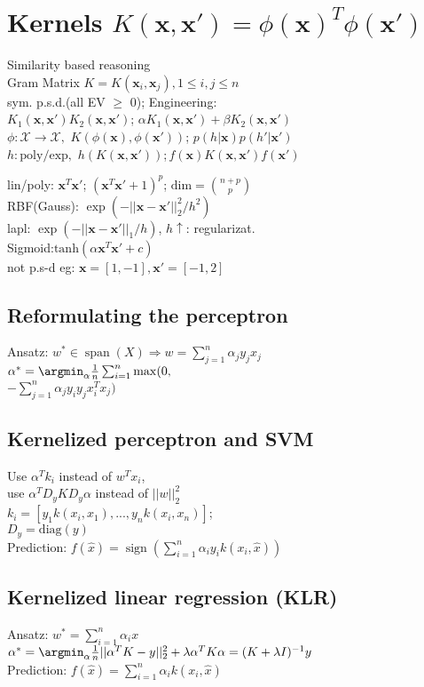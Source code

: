 \section*{Kernels $K(\mathbf{x}, \mathbf{x'}) {=} \phi(\mathbf{x})^T\phi(\mathbf{x'})$}
Similarity based reasoning\\
Gram Matrix $K{=}K(\mathbf{x}_i, \mathbf{x}_j), 1{\leq} i,j{\leq} n$\\
sym. p.s.d.(all EV $\geq$ 0); Engineering:\\
$K_1(\mathbf{x}, \mathbf{x'})K_2(\mathbf{x}, \mathbf{x'})$; 
$\alpha K_1(\mathbf{x}, \mathbf{x'})+\beta K_2(\mathbf{x}, \mathbf{x'})$\\
$\phi:\mathcal{X}{\rightarrow}\mathcal{X},\,\,K(\phi(\mathbf{x}), \phi(\mathbf{x'}))$; $p(h|\mathbf{x})p(h'|\mathbf{x'})$\\ 
$h: \mathrm{poly/exp},\,\, h(K(\mathbf{x}, \mathbf{x'}))$;$ \, f(\mathbf{x})K(\mathbf{x},\mathbf{x'})f(\mathbf{x'})$

lin/poly: $\mathbf{x}^T\mathbf{x'}$; $(\mathbf{x}^T\mathbf{x'}{+}1)^p$;
$\mathrm{dim}=\binom{n+p}{p}$\\
RBF(Gauss): $\exp(-||\mathbf{x}{-}\mathbf{x'}||_2^2/h^2)$\\
lapl: $\exp(-||\mathbf{x}{-}\mathbf{x'}||_1/h)$, $h\uparrow$: regularizat.\\
Sigmoid:$\mathrm{tanh}(\alpha\mathbf{x}^T\mathbf{x'}+c)$\\
not p.s-d eg: $\mathbf{x}{=}[1,-1], \mathbf{x'}{=}[-1,2]$

\subsection*{Reformulating the perceptron}
Ansatz: $w^* \in \operatorname{span}(X) \Rightarrow w = \sum_{j=1}^n \alpha_j y_j x_j$\\
$\alpha^*= \argmin_{\alpha} \frac{1}{n} \sum_{i=1}^n \max(0,$\\$- \sum_{j=1}^n \alpha_j y_i y_j x_i^T x_j)$

\subsection*{Kernelized perceptron and SVM}
Use $\alpha^T k_i$ instead of $w^T x_i$,\\
use $\alpha^T D_y K D_y \alpha$ instead of $||w||_2^2$\\ 
$k_i=[y_1 k(x_i,x_1), ..., y_n k(x_i,x_n)]$;\\
$D_y = \text{diag}(y)$\\
Prediction: $f(\hat{x}) = \operatorname{sign}(\sum_{i=1}^n \alpha_i y_i k(x_i, \hat{x}))$

\subsection*{Kernelized linear regression (KLR)}
Ansatz: $w^*=\sum_{i = 1}^n \alpha_i x$\\
$\alpha^*= \argmin_{\alpha}\frac{1}{n} ||\alpha^T K - y||_2^2 + \lambda \alpha^T K \alpha \\= (K+\lambda I)^{-1} y$\\
Prediction: $f(\hat{x}) = \sum \limits_{i=1}^n \alpha_i k(x_i,\hat{x})$